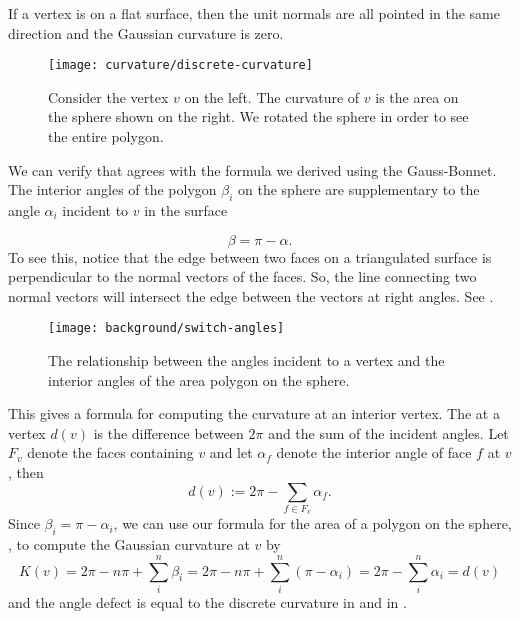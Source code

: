 If a vertex is on a flat surface, then the unit normals are all pointed
in the same direction and the Gaussian curvature is zero.

\begin{figure}[htb]
\centering
\texttt{[image: curvature/discrete-curvature]}
\caption{Consider the vertex $v$ on the left. The curvature of $v$
is the area on the sphere shown on the right. We rotated the sphere
in order to see the entire polygon.}
\label{fig:discrete-curvature}
\end{figure}


We can verify that  agrees with the formula we derived using
the Gauss-Bonnet.
The interior angles of the polygon $\beta_i$ on the sphere are supplementary to
the angle $\alpha_i$ incident to $v$ in the surface

\begin{equation} \label{eqn:switcheroo}
\beta=\pi-\alpha.
\end{equation}
To see this, notice that the edge between two faces
on a triangulated surface
is perpendicular to the normal vectors of the faces.
So, the line connecting two normal vectors will intersect the edge between the vectors 
at right angles. See .


\begin{figure}[htb]
\centering
\texttt{[image: background/switch-angles]}
\caption{The relationship between the angles incident to a vertex and
the interior angles of the area polygon on the sphere.}
\label{fig:switcheroo}
\end{figure}



This gives a  formula for computing the curvature at an interior vertex.
The  at a vertex $d(v)$ is the difference between $2\pi$ and
the sum of the incident angles.  Let $F_v$ denote the faces containing $v$  
and let $\alpha_f$  denote the interior  angle of face $f$ at $v$, then
\begin{equation} \label{eqn:defect}
d(v):=2\pi -\sum_{f\in F_v}\alpha_f.
\end{equation}
Since $\beta_i=\pi-\alpha_i$,
we can use our formula for the area of a polygon on the sphere,
, to compute the Gaussian curvature at $v$
by
$$K(v)=2\pi -n\pi+\sum_{i}^n \beta_i=2\pi-n\pi +\sum_{i}^n (\pi-\alpha_i) =2\pi-\sum_i^n\alpha_i=d(v)$$
 and the
 angle defect is equal to the discrete curvature in 
 and in .







